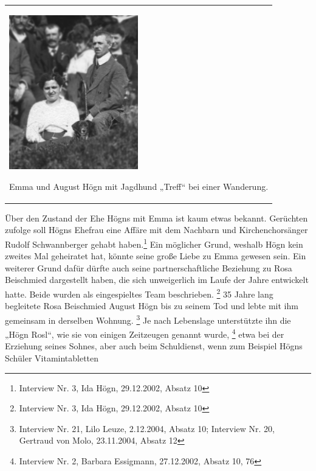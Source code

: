 \begin{center}
\begin{minipage}{5.992cm}
\begin{center}
\tablefirsthead{}
\tablehead{}
\tabletail{}
\tablelasttail{}
\begin{supertabular}{m{5.7920003cm}}

\includegraphics[width=5.609cm,height=6.705cm]{pictures/zulassungsarbeit-img024.jpg}

Emma und August Högn mit Jagdhund
„Treff“ bei einer Wanderung.\\
\end{supertabular}
\end{center}
\end{minipage}
\end{center}
Über den Zustand der Ehe Högns mit Emma ist kaum etwas bekannt.
Gerüchten zufolge soll Högns Ehefrau eine Affäre mit dem Nachbarn und
Kirchenchorsänger Rudolf Schwannberger gehabt haben.\footnote{
Interview Nr. 3, Ida Högn, 29.12.2002, Absatz 10} Ein möglicher Grund,
weshalb Högn kein zweites Mal geheiratet hat, könnte seine große Liebe
zu Emma gewesen sein. Ein weiterer Grund dafür dürfte auch seine
partnerschaftliche Beziehung zu Rosa Beischmied dargestellt haben, die
sich unweigerlich im Laufe der Jahre entwickelt hatte. Beide wurden als
eingespieltes Team beschrieben. \footnote{Interview Nr. 3, Ida Högn,
29.12.2002, Absatz 10} 35 Jahre lang begleitete Rosa Beischmied August
Högn bis zu seinem Tod und lebte mit ihm gemeinsam in derselben
Wohnung. \footnote{Interview Nr. 21, Lilo Leuze, 2.12.2004, Absatz 10;
Interview Nr. 20, Gertraud von Molo, 23.11.2004, Absatz 12} Je nach
Lebenslage unterstützte ihn die „Högn Rosl“, wie sie von einigen
Zeitzeugen genannt wurde, \footnote{Interview Nr. 2, Barbara Essigmann,
27.12.2002, Absatz 10, 76} etwa bei der Erziehung seines Sohnes, aber
auch beim Schuldienst, wenn zum Beispiel Högns Schüler Vitamintabletten
